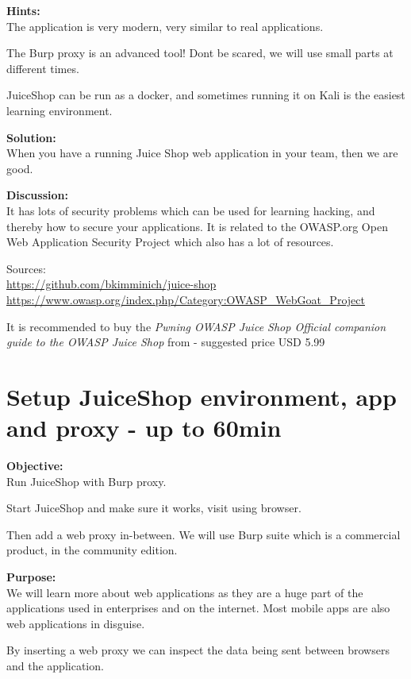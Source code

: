 \documentclass[a4paper,11pt,notitlepage]{report}
\begin{document}


{\bf Hints:}\\
The application is very modern, very similar to real applications.

The Burp proxy is an advanced tool! Dont be scared, we will use small parts at different times.

JuiceShop can be run as a docker, and sometimes running it on Kali is the easiest learning environment.

{\bf Solution:}\\
When you have a running Juice Shop web application in your team, then we are good.

{\bf Discussion:}\\
It has lots of security problems which can be used for learning
hacking, and thereby how to secure your applications. It is  related
to the OWASP.org Open Web Application Security Project which also has a
lot of resources.

Sources:\\
\url{https://github.com/bkimminich/juice-shop}\\
\url{https://www.owasp.org/index.php/Category:OWASP_WebGoat_Project}

It is recommended to buy the \emph{Pwning OWASP Juice Shop Official companion guide to the OWASP Juice Shop} from  - suggested price USD 5.99



\chapter{Setup JuiceShop environment, app and proxy - up to 60min}
\label{ex:js-burp}

{\bf Objective:}\\
Run JuiceShop with Burp proxy.

Start JuiceShop and make sure it works, visit using browser.

Then add a web proxy in-between. We will use Burp suite which is a commercial product, in the community edition.

{\bf Purpose:}\\
We will learn more about web applications as they are a huge part of the applications used in enterprises and on the internet. Most mobile apps are also web applications in disguise.

By inserting a web proxy we can inspect the data being sent between browsers and the application.
\end{document}
